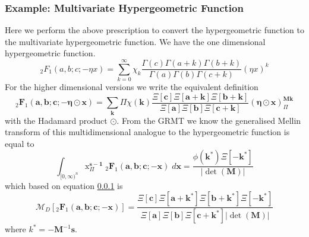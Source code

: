 \documentclass[journal=jcisd8,manuscript=article,layout=onecolumn,pdftex,floatfix,amsmath,amssymb,10pt]{achemso}
\begin{document}
\subsubsection{Example: Multivariate Hypergeometric Function}
Here we perform the above prescription to convert the hypergeometric function to the multivariate hypergeometric function. We have the one dimensional hypergeometric function.
\begin{equation}
_2F_1(a,b;c;-\eta x) = \sum_{k=0}^\infty \chi_k \frac{\Gamma(c)\Gamma(a+k)\Gamma(b+k)}{\Gamma(a)\Gamma(b)\Gamma(c+k)} (\eta x)^k
\end{equation}
For the higher dimensional versions we write the equivalent definition
\begin{equation}
_2\mathbf{F}_1(\mathbf{a},\mathbf{b};\mathbf{c};-\boldsymbol\eta\odot\mathbf{x}) = \sum_{\mathbf{k}}\Pi\chi(\mathbf{k})\frac{\Xi[\mathbf{c}]\Xi[\mathbf{a}+\mathbf{k}]\Xi[\mathbf{b}+\mathbf{k}]}{\Xi[\mathbf{a}]\Xi[\mathbf{b}]\Xi[\mathbf{c}+\mathbf{k}]}{(\boldsymbol\eta\odot\mathbf{x})}^{\mathbf{M}\mathbf{k}}_\Pi
\end{equation}
with the Hadamard product $\odot$. From the GRMT we know the generalised Mellin transform of this multidimensional analogue to the hypergeometric function is equal to
\begin{equation}
\int_{[0,\infty)^n}\mathrm{x}^{\mathbf{s-1}}_\Pi\;_2\mathbf{F}_1(\mathbf{a},\mathbf{b};\mathbf{c};-\mathbf{x})\; d\mathbf{x} = \frac{\phi(\mathbf{k}^*)\Xi[-\mathbf{k}^*]}{|\det(\mathbf{M})|}
\end{equation}
which based on equation \ref{} is \begin{equation}
\mathcal{M}_D[_2\mathbf{F}_1(\mathbf{a},\mathbf{b};\mathbf{c};-\mathbf{x})] = \frac{\Xi[\mathbf{c}]\Xi[\mathbf{a}+\mathbf{k}^*]\Xi[\mathbf{b}+\mathbf{k}^*]\Xi[-\mathbf{k}^*]}{\Xi[\mathbf{a}]\Xi[\mathbf{b}]\Xi[\mathbf{c}+\mathbf{k}^*]|\det(\mathbf{M})|}
\end{equation}
where $k^* = -\mathbf{M}^{-1}\mathbf{s}$.

\end{document}
